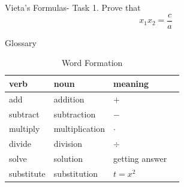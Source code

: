 \documentclass[final]{beamer}
\newlength{\onecolwid}
\begin{document}
\begin{frame}[t]
\begin{columns}[t]
    \begin{column}{\onecolwid} %


      \begin{block}{Vieta's Formulas- Task}
        1. Prove that $$x_1x_2 = \frac{c}{a}$$
        \[\]
        \[\]
        \[\]
        \[\]
        \[\]

      \end{block}




      \begin{block}{Glossary}

        \begin{table}
          \vspace{2ex}
          \begin{tabular}{l l l l}
            \toprule
            \textbf{verb} & \textbf{noun} & \textbf{meaning}\\
            \midrule
            add & addition & $+$ \\
            subtract & subtraction & $-$ \\
            multiply & multiplication & $\cdot$ \\
            divide & division & $\div$ \\
            solve & solution & getting answer \\
            substitute & substitution & $t=x^2$ \\



            \bottomrule
          \end{tabular}
          \caption{Word Formation}
        \end{table}


      \end{block}



\end{column}
\end{columns}
\end{frame}
\end{document}
